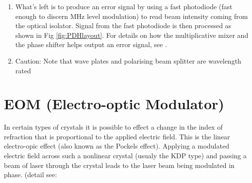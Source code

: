 \documentclass[12pt]{report}
\begin{document}
\begin{enumerate}
    \item What's left is to produce an error signal by using a fast photodiode (fast enough to discern MHz level modulation) to read beam intensity coming from the optical isolator. Signal from the fast photodiode is then processed as shown in Fig \ref{fig:PDHlayout}. For details on how the multiplicative mixer and the phase shifter helps output an error signal, see \cite{PDHintro}.

    \item Caution: Note that wave plates and polarising beam splitter are wavelength rated
\end{enumerate}

\section{EOM (Electro-optic Modulator)}
In certain types of crystals it is possible to effect a change in the index of refraction that is proportional to the applied electric field. This is the linear electro-opic effect (also known as the Pockels effect). Applying a modulated electric field across such a nonlinear crystal (usualy the KDP type) and passing a beam of laser through the crystal leads to the laser beam being modulated in phase. (detail see: \cite{fundamentalsOfPhotonics}
\end{document}
